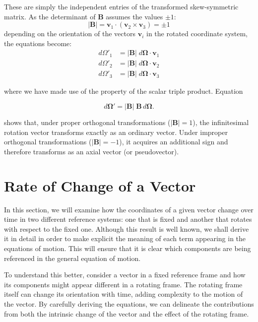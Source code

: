 \documentclass[12pt]{article}
\begin{document}
These are simply the independent entries of the transformed skew-symmetric matrix.
As the determinant of $\mathbf{B}$ assumes the values $\pm 1$:
\[
  |\mathbf{B}| = \mathbf{v}_1\cdot(\mathbf{v}_2\times\mathbf{v}_3) = \pm 1
\]
depending on the orientation of the vectors $\mathbf{v}_i$ in the rotated coordinate system,
the equations become:
\begin{align}
  d\Omega'_1 &= |\mathbf{B}|\; d\boldsymbol{\Omega}\cdot\mathbf{v}_1 \\
  d\Omega'_2 &= |\mathbf{B}|\; d\boldsymbol{\Omega}\cdot\mathbf{v}_2 \\
  d\Omega'_3 &= |\mathbf{B}|\; d\boldsymbol{\Omega}\cdot\mathbf{v}_3
\end{align}

where we have made use of the property of the scalar triple product. Equation

\[
  d\boldsymbol{\Omega}' = |\mathbf{B}|\;\mathbf{B}\,d\boldsymbol{\Omega}.
\]

shows that, under proper orthogonal transformations ($|\mathbf{B}|=1$), the
infinitesimal rotation vector transforms exactly as an ordinary vector.
Under improper orthogonal transformations ($|\mathbf{B}|=-1$), it acquires an
additional sign and therefore transforms as an axial vector (or pseudovector).

\section{Rate of Change of a Vector}

In this section, we will examine how the coordinates of a given vector change over time in
two different reference systems: one that is fixed and another that rotates with respect to
the fixed one. Although this result is well known, we shall derive it in detail in order to make
 explicit the meaning of each term appearing in the equations of motion.
 This will ensure that it is clear which components are being referenced in
the general equation of motion.

To understand this better, consider a vector in a fixed reference frame and how its
components might appear different in a rotating frame. The rotating frame itself can change
its orientation with time, adding complexity to the motion of the vector. By carefully
deriving the equations, we can delineate the contributions from both the intrinsic change of
the vector and the effect of the rotating frame.
\end{document}
